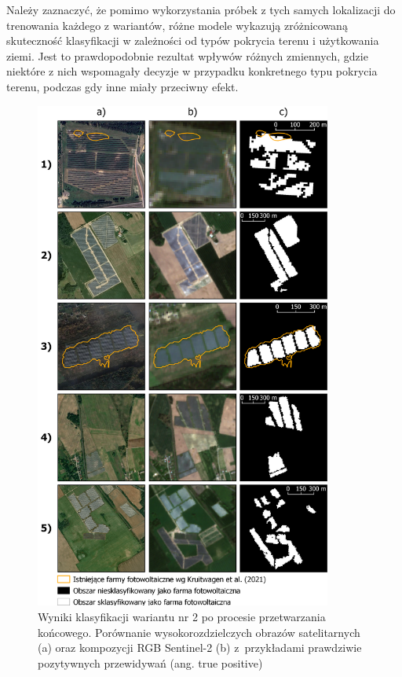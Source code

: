 \documentclass{amuthesis}
\begin{document}
Należy zaznaczyć, że pomimo wykorzystania próbek z tych samych
lokalizacji do trenowania każdego z wariantów, różne modele wykazują
zróżnicowaną skuteczność klasyfikacji w zależności od typów pokrycia
terenu i użytkowania ziemi. Jest to prawdopodobnie rezultat wpływów
różnych zmiennych, gdzie niektóre z nich wspomagały decyzje w przypadku
konkretnego typu pokrycia terenu, podczas gdy inne miały przeciwny
efekt.

\begin{figure}[t]

{\centering \includegraphics[width=0.87\textwidth,height=\textheight]{figures/pv_dataset2.png}

}

\caption{\label{fig-rycina-truepositive-dataset2}Wyniki klasyfikacji
wariantu nr 2 po procesie przetwarzania końcowego. Porównanie
wysokorozdzielczych obrazów satelitarnych (a) oraz kompozycji RGB
Sentinel-2 (b) z~przykładami prawdziwie pozytywnych przewidywań (ang.
true positive)}

\end{figure}
\end{document}
